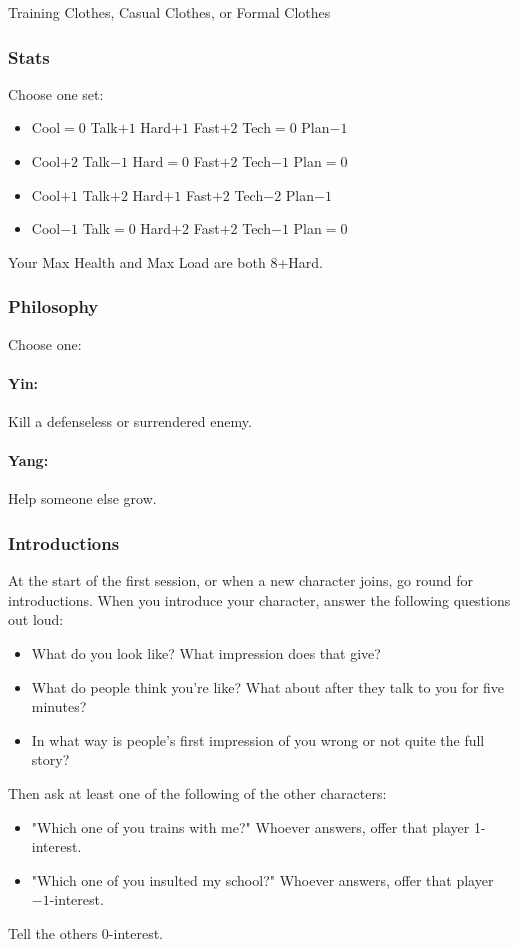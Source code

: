 Training Clothes, Casual Clothes, or Formal Clothes

\subsubsection{Stats}
Choose one set:
\begin{itemize}
\setlength\itemsep{0em}
\item Cool${=}0$ Talk$+1$ Hard$+1$ Fast$+2$ Tech${=}0$ Plan$-1$
\item Cool$+2$ Talk$-1$ Hard${=}0$ Fast$+2$ Tech$-1$ Plan${=}0$
\item Cool$+1$ Talk$+2$ Hard$+1$ Fast$+2$ Tech$-2$ Plan$-1$
\item Cool$-1$ Talk${=}0$ Hard$+2$ Fast$+2$ Tech$-1$ Plan${=}0$
\end{itemize}

Your Max Health and Max Load are both 8+Hard.

\subsubsection{Philosophy}
Choose one:
\paragraph{Yin:} Kill a defenseless or surrendered enemy.
\paragraph{Yang:} Help someone else grow.

\subsubsection{Introductions}
At the start of the first session, or when a new character joins, go round for introductions.
When you introduce your character, answer the following questions out loud:
\begin{itemize}
\item What do you look like? What impression does that give?
\item What do people think you're like? What about after they talk to you for five minutes?
\item In what way is people's first impression of you wrong or not quite the full story?
\end{itemize}

Then ask at least one of the following of the other characters:
\begin{itemize}
\item "Which one of you trains with me?" Whoever answers, offer that player 1-interest.
\item "Which one of you insulted my school?" Whoever answers, offer that player $-1$-interest.
\end{itemize}
Tell the others 0-interest.

